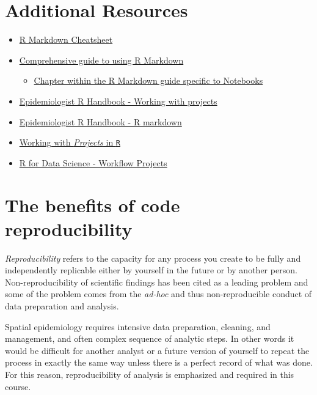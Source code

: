 \documentclass[
]{book}
\providecommand{\tightlist}{%
  \setlength{\itemsep}{0pt}\setlength{\parskip}{0pt}}
\begin{document}
\hypertarget{additional-resources-3}{%
\section*{Additional Resources}\label{additional-resources-3}}

\begin{itemize}
\tightlist
\item
  \href{https://github.com/rstudio/cheatsheets/raw/master/rmarkdown.pdf}{R Markdown Cheatsheet}
\item
  \href{https://bookdown.org/yihui/rmarkdown/}{Comprehensive guide to using R Markdown}

  \begin{itemize}
  \tightlist
  \item
    \href{https://bookdown.org/yihui/rmarkdown/notebook.html}{Chapter within the R Markdown guide specific to Notebooks}
  \end{itemize}
\item
  \href{https://epirhandbook.com/r-projects.html}{Epidemiologist R Handbook - Working with projects}
\item
  \href{https://epirhandbook.com/reports-with-r-markdown.html\#r-markdown-components}{Epidemiologist R Handbook - R markdown}
\item
  \href{https://support.rstudio.com/hc/en-us/articles/200526207-Using-Projects}{Working with \emph{Projects} in \texttt{R}}
\item
  \href{https://r4ds.had.co.nz/workflow-projects.html}{R for Data Science - Workflow Projects}
\end{itemize}

\hypertarget{the-benefits-of-code-reproducibility}{%
\section{The benefits of code reproducibility}\label{the-benefits-of-code-reproducibility}}

\emph{Reproducibility} refers to the capacity for any process you create to be fully and independently replicable either by yourself in the future or by another person. Non-reproducibility of scientific findings has been cited as a leading problem and some of the problem comes from the \emph{ad-hoc} and thus non-reproducible conduct of data preparation and analysis.

Spatial epidemiology requires intensive data preparation, cleaning, and management, and often complex sequence of analytic steps. In other words it would be difficult for another analyst or a future version of yourself to repeat the process in exactly the same way unless there is a perfect record of what was done. For this reason, reproducibility of analysis is emphasized and required in this course.
\end{document}
